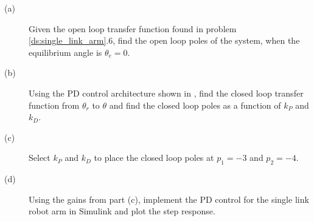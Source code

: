 
\begin{description}
\item[(a)]
Given the open loop transfer function found in problem \ref{ds:single_link_arm}.6, find the open loop poles of the system, when the equilibrium angle is $\theta_e=0$.
\item[(b)]
Using the PD control architecture shown in , find the closed loop transfer function from $\theta_r$ to $\theta$ and find the closed loop poles as a function of $k_P$ and $k_D$.
\item[(c)]  Select $k_P$ and $k_D$ to place the closed loop poles at $p_1=-3$ and $p_2=-4$.
\item[(d)] Using the gains from part (c), implement the PD control for the single link robot arm in Simulink and plot the step response.

\end{description}